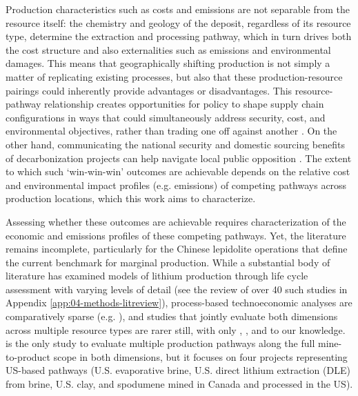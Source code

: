 \documentclass{article}
\renewcommand\_{\textunderscore\allowbreak}
\begin{document}
Production characteristics such as costs and emissions are not separable from the resource itself: the chemistry and geology of the deposit, regardless of its resource type, determine the extraction and processing pathway, which in turn drives both the cost structure and also externalities such as emissions and environmental damages. This means that geographically shifting production is not simply a matter of replicating existing processes, but also that these production-resource pairings could inherently provide advantages or disadvantages. This resource-pathway relationship creates opportunities for policy to shape supply chain configurations in ways that could simultaneously address security, cost, and environmental objectives, rather than trading one off against another \cite{riofrancosSecuritySustainabilityNexus2023, haddadHowMakeLithium2023, buschEffectsDemandRecycling2025}. On the other hand, communicating the national security and domestic sourcing benefits of decarbonization projects can help navigate local public opposition \cite{ujiPursuingDecarbonizationNational2023}. The extent to which such `win-win-win' outcomes are achievable depends on the relative cost and environmental impact profiles (e.g. emissions) of competing pathways across production locations, which this work aims to characterize.

Assessing whether these outcomes are achievable requires characterization of the economic and emissions profiles of these competing pathways. Yet, the literature remains incomplete, particularly for the Chinese lepidolite operations that define the current benchmark for marginal production. While a substantial body of literature has examined models of lithium production through life cycle assessment with varying levels of detail (see the review of over 40 such studies in Appendix \ref{app:04-methods-litreview}), process-based technoeconomic analyses are comparatively sparse (e.g.  \cite{wesselkaemperOptimizationProcessingCosts2025, warrenTechnoEconomicAnalysisLithium2021}), and studies that jointly evaluate both dimensions across multiple resource types are rarer still, with only \citet{mousavinezhadNextLithiumBoom2025}, \citet{gaoLithiumExtractionHard2023}, and \citet{tianIntegratedEnvironmentalEconomic2026} to our knowledge. \citet{mousavinezhadNextLithiumBoom2025} is the only study to evaluate multiple production pathways along the full mine-to-product scope in both dimensions, but it focuses on four projects representing US-based pathways (U.S. evaporative brine, U.S. direct lithium extraction (DLE) from brine, U.S. clay, and spodumene mined in Canada and processed in the US). 
\end{document}
